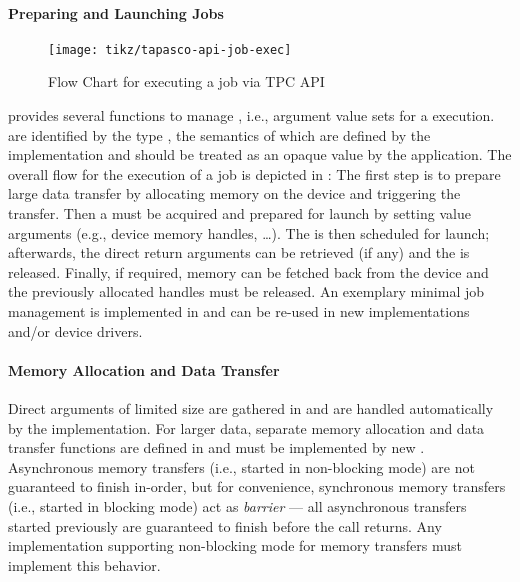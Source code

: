 \paragraph{Preparing and Launching Jobs}
%
\begin{figure}
  \centering\texttt{[image: tikz/tapasco-api-job-exec]}
  \caption{Flow Chart for executing a job via TPC API}
  \label{fig:tapasco-api-job-exec}
\end{figure}
%
 provides several functions to manage , i.e., argument value sets for a  execution.
 are identified by the type , the semantics of which are defined by the  implementation and should be treated as an opaque value by the application.
The overall flow for the execution of a job is depicted in :
The first step is to prepare large data transfer by allocating memory on the device and triggering the transfer.
Then a  must be acquired and prepared for launch by setting value arguments (e.g., device memory handles, \ldots).
The  is then scheduled for launch; afterwards, the direct return arguments can be retrieved (if any) and the  is released.
Finally, if required, memory can be fetched back from the device and the previously allocated handles must be released.
An exemplary minimal job management is implemented in  and can be re-used in new implementations and/or device drivers.

\paragraph{Memory Allocation and Data Transfer}
Direct  arguments of limited size are gathered in  and are handled automatically by the  implementation.
For larger data, separate memory allocation and data transfer functions are defined in  and must be implemented by new .
Asynchronous memory transfers (i.e., started in non-blocking mode) are not guaranteed to finish in-order, but for convenience, synchronous memory transfers (i.e., started in blocking mode) act as \emph{barrier} --- all asynchronous transfers started previously are guaranteed to finish before the call returns.
Any  implementation supporting non-blocking mode for memory transfers must implement this behavior.

